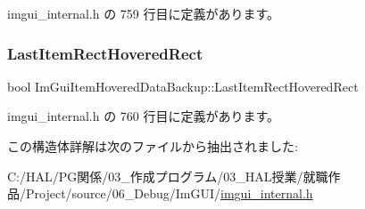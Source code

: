  imgui\+\_\+internal.\+h の 759 行目に定義があります。

\mbox{\label{struct_im_gui_item_hovered_data_backup_a48dd47c573d5299de25be908d77f23f0}} 
\subsubsection{\texorpdfstring{Last\+Item\+Rect\+Hovered\+Rect}{LastItemRectHoveredRect}}
{\footnotesize\ttfamily bool Im\+Gui\+Item\+Hovered\+Data\+Backup\+::\+Last\+Item\+Rect\+Hovered\+Rect}



 imgui\+\_\+internal.\+h の 760 行目に定義があります。



この構造体詳解は次のファイルから抽出されました\+:\begin{DoxyCompactItemize}
\item 
C\+:/\+H\+A\+L/\+P\+G関係/03\+\_\+作成プログラム/03\+\_\+\+H\+A\+L授業/就職作品/\+Project/source/06\+\_\+\+Debug/\+Im\+G\+U\+I/\mbox{\hyperlink{imgui__internal_8h}{imgui\+\_\+internal.\+h}}\end{DoxyCompactItemize}
